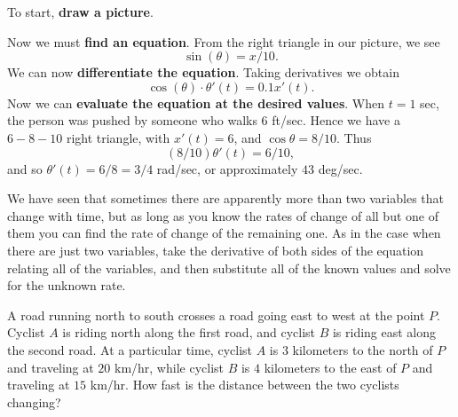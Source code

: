 \begin{solution}
To start, \textbf{draw a picture}.


Now we must \textbf{find an equation}. From the right triangle in our
picture, we see
\[
\sin(\theta)=x/10.
\]
We can now \textbf{differentiate the equation}. Taking derivatives we obtain 
\[
\cos(\theta)\cdot \theta'(t)=0.1 x'(t).
\]
Now we can \textbf{evaluate the equation at the desired values}.  When
$t=1$ sec, the person was pushed by someone who walks $6$
ft/sec. Hence we have a $6-8-10$ right triangle, with $x'(t) = 6$, and
$\cos\theta=8/10$. Thus
\[
(8/10) \theta'(t) =6/10,
\]
and so  $\theta'(t)=6/8=3/4$ rad/sec, or approximately $43$ deg/sec.
\end{solution} 



We have seen that sometimes there are apparently more than two
variables that change with time, but as long as you know the rates of
change of all but one of them you can find the rate of change of the
remaining one.  As in the case when there are just two variables, take
the derivative of both sides of the equation relating all of the
variables, and then substitute all of the known values and solve for
the unknown rate.



\begin{example}
A road running north to south crosses a road going east to west at the
point $P$.  Cyclist $A$ is riding north along the first road, and cyclist $B$ is
riding east along the second road.  At a particular time, cyclist $A$ is $3$
kilometers to the north of $P$ and traveling at $20$ km/hr, while cyclist
$B$ is $4$ kilometers to the east of $P$ and traveling at $15$ km/hr.
How fast is the distance between the two cyclists changing?
\end{example}

